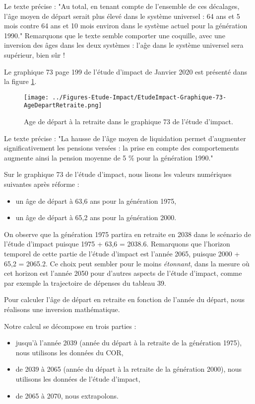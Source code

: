 \documentclass[10pt]{article}
\begin{document}
Le texte précise : "Au total, en tenant compte de l’ensemble de ces 
décalages, l’âge moyen de départ serait plus élevé dans le système 
universel : 64 ans et 5 mois contre 64 ans et 10 mois environ dans 
le système actuel pour la génération 1990." 
Remarquons que le texte semble comporter une coquille, avec une inversion 
des âges dans les deux systèmes : l'aĝe dans le système universel sera supérieur, 
bien sûr ! 

Le graphique 73 page 199 de l'étude d'impact de Janvier 2020 est présenté 
dans la figure \ref{fig-age-etude-impact-graphique-73}.

\begin{figure}
\begin{center}
\texttt{[image: ../Figures-Etude-Impact/EtudeImpact-Graphique-73-AgeDepartRetraite.png]}
\end{center}
\caption{Age de départ à la retraite dans le graphique 73 de l'étude d'impact.}
\label{fig-age-etude-impact-graphique-73}
\end{figure}

Le texte précise : "La hausse de l’âge moyen de liquidation permet d’augmenter 
significativement les pensions versées : la prise en compte des comportements 
augmente ainsi la pension moyenne de 5 \% pour la génération 1990."

Sur le graphique 73 de l'étude d'impact, nous lisons les valeurs numériques 
suivantes après réforme :
\begin{itemize}
\item un âge de départ à 63,6 ans pour la génération 1975,
\item un âge de départ à 65,2 ans pour la génération 2000.
\end{itemize}

On observe que la génération 1975 partira en retraite en 2038 dans le scénario de l'étude d'impact puisque 1975 + 63,6 = 2038.6.
Remarquons que l'horizon temporel de cette partie de l'étude d'impact est l'année 2065, puisque 2000 + 65,2 = 2065.2. 
Ce choix peut sembler pour le moins \emph{étonnant}, dans la mesure où cet horizon 
est l'année 2050 pour d'autres aspects de l'étude d'impact, 
comme par exemple la trajectoire de dépenses du tableau 39. 

Pour calculer l'âge de départ en retraite en fonction de l'année du départ, 
nous réalisons une inversion mathématique.  

Notre calcul se décompose en trois parties :
\begin{itemize}
\item jusqu'à l'année 2039 (année du départ à la retraite 
de la génération 1975), nous utilisons les données du COR, 
\item de 2039 à 2065 (année du départ à la retraite de la génération 
2000), nous utilisons les données de l'étude d'impact,
\item de 2065 à 2070, nous extrapolons. 
\end{itemize}
\end{document}
